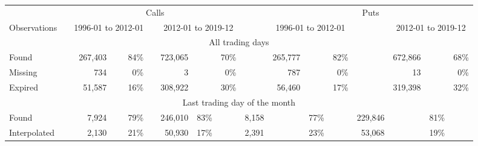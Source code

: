 

		\begin{tabular}{*{2}{l} *{15}{r} }
		       
		        
		         \multicolumn{2}{c}{}  & \multicolumn{7}{c}{Calls}  &  \multicolumn{1}{c}{} & 
		         \multicolumn{7}{c}{Puts} \\
		         
		          
		         \cline{3-9}
		         \cline{11-17}
		       
		         
		          \multicolumn{1}{l}{Observations} &  \multicolumn{1}{l}{} &
		          \multicolumn{3}{c}{1996-01 to 2012-01} & 
		          \multicolumn{1}{c}{} &
			\multicolumn{3}{c}{2012-01 to 2019-12} & 
			\multicolumn{1}{c}{} &
		          \multicolumn{3}{c}{1996-01 to 2012-01} & 
		          \multicolumn{1}{c}{} &
			\multicolumn{3}{c}{2012-01 to 2019-12} \\
		        

		       \hline
		       
		       \multicolumn{17}{c}{All trading days} \\ 
		       
		       \hline 

	
		Found &   & 
		267,403 &  & 84\% & 
		 & 
		 723,065 &  &70\% & 
		 & 
		 265,777 &  & 82\% & 
		 & 
		 672,866& &68\% 
		 \\

		
		Missing &   & 
		734 &  & 0\% & 
		 & 
		 3 &  &0\% & 
		 & 
		 787 &  & 0\% & 
		 & 
		 13& &0\% 
		 \\

		
		Expired &   & 
		51,587 &  & 16\% & 
		 & 
		 308,922 &  &30\% & 
		 & 
		 56,460 &  & 17\% & 
		 & 
		 319,398& &32\% 
		 \\

		
        \hline
        
         \multicolumn{17}{c}{Last trading day of the month} \\

	
		Found &   & 
		7,924 &  & 79\% & 
		 & 
		 246,010 & 83\% & 
		 & 
		 8,158 &  & 77\% & 
		 & 
		 229,846& &81\% 
		 \\

		
		Interpolated &   & 
		2,130 &  & 21\% & 
		 & 
		 50,930 & 17\% & 
		 & 
		 2,391 &  & 23\% & 
		 & 
		 53,068& &19\% 
		 \\

		

	        \hline
	    \end{tabular}
	